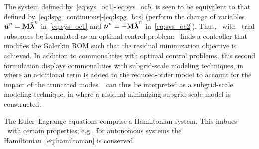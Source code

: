 The system defined by~\eqref{eq:sys_oc1}-\eqref{eq:sys_oc5} is seen to be equivalent to that defined by~\eqref{eq:lspg_continuous}-\eqref{eq:lspg_bcs} (perform 
the change of variables ${\hat{\boldsymbol u}^{n}} = \mathbf{M} \hat{\boldsymbol \lambda}^{n}$ in~\eqref{eq:sys_oc1} and $\hat{\boldsymbol \nu}^{n} = -\mathbf{M} \hat{\boldsymbol \lambda}^{n}$ in~\eqref{eq:sys_oc2}). 
Thus, \methodAcronym\ with \spatialAcronym\ trial subspaces be formulated as an optimal control problem: \methodAcronym\ finds a controller that modifies the Galerkin ROM such that the residual minimization objective is achieved. In addition to commonalities with optimal control problems, this second formulation displays commonalities with subgrid-scale modeling techniques, in where an additional term is added to the reduced-order model to account for the impact of the truncated modes. \methodAcronym\ can thus be interpreted as a subgrid-scale modeling technique, in where a residual minimizing subgrid-scale model is constructed.

\begin{remark}
The Euler--Lagrange equations comprise a Hamiltonian system. This imbues \methodAcronym\ with certain properties; e.g., for autonomous systems the Hamiltonian~\eqref{eq:hamiltonian} is conserved. 
\end{remark} 

